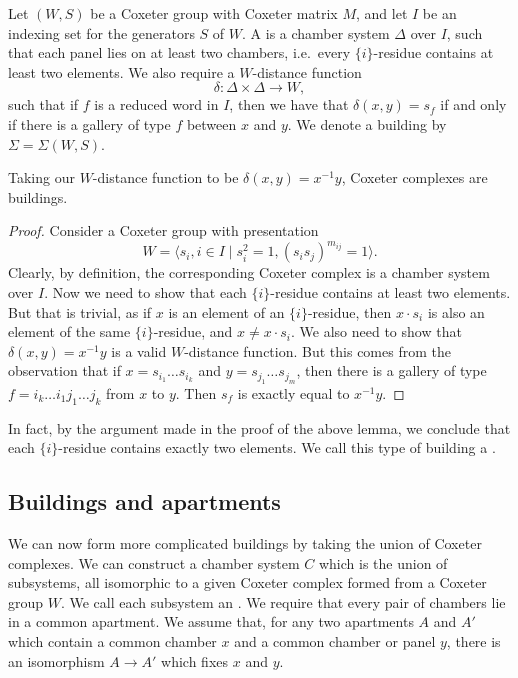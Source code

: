 \documentclass[11pt]{article}
\begin{document}
\begin{definition}
    Let $(W,S)$ be a Coxeter group with Coxeter matrix $M$, and let $I$ be an indexing set for the generators $S$ of $W$. A  is a chamber system $\Delta$ over $I$, such that each panel lies on at least two chambers, i.e.\ every $\{i\}$-residue contains at least two elements. We also require a $W$-distance function
    \[\delta:\Delta\times \Delta \to W,\]
    such that if $f$ is a reduced word in $I$, then we have that $\delta(x,y)=s_f$ if and only if there is a gallery of type $f$ between $x$ and $y$. We denote a building by $\Sigma=\Sigma(W,S)$. 
\end{definition}

\begin{lemma}\label{cox}
    Taking our $W$-distance function to be $\delta(x,y)=x^{-1}y$, Coxeter complexes are buildings.
\end{lemma}

\begin{proof}
    Consider a Coxeter group with presentation
    \[W=\langle s_i,i\in I\mid s_i^2=1,(s_is_j)^{m_{ij}}=1\rangle.\]
    Clearly, by definition, the corresponding Coxeter complex is a chamber system over $I$. Now we need to show that each $\{i\}$-residue contains at least two elements. But that is trivial, as if $x$ is an element of an $\{i\}$-residue, then $x\cdot s_i$ is also an element of the same $\{i\}$-residue, and $x\neq x\cdot s_i$. 
    We also need to show that $\delta(x,y)=x^{-1}y$ is a valid $W$-distance function. But this comes from the observation that if $x=s_{i_1}\hdots  s_{i_k}$ and $y=s_{j_1}\hdots  s_{j_m}$, then there is a gallery of type $f=i_k\hdots  i_1j_1\hdots  j_k$ from $x$ to $y$. Then $s_f$ is exactly equal to $x^{-1}y$. 
\end{proof}

In fact, by the argument made in the proof of the above lemma, we conclude that each $\{i\}$-residue contains exactly two elements. We call this type of building a .


\subsection{Buildings and apartments}\label{apartments}
We can now form more complicated buildings by taking the union of Coxeter complexes. We can construct a chamber system $C$ which is the union of subsystems, all isomorphic to a given Coxeter complex formed from a Coxeter group $W$. We call each subsystem an . We require that every pair of chambers lie in a common apartment. We assume that, for any two apartments $A$ and $A'$ which contain a common chamber $x$ and a common chamber or panel $y$, there is an isomorphism $A\to A'$ which fixes $x$ and $y$.  
\end{document}
